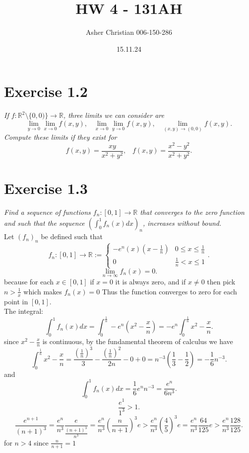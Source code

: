 \documentclass{amsart}
\title{HW 4 - 131AH}
\author{Asher Christian 006-150-286}
\date{15.11.24}
\begin{document}
    \maketitle
    \section{Exercise 1.2}
    \emph{If $f: \mathbb{R}^2 \setminus \{0,0)\} \rightarrow \mathbb{R}$, three limits we can consider are
        \[
        \lim_{y\to 0}\lim_{x\to 0}f(x,y), \;\;\; \lim_{x\to 0}\lim_{y\to 0}f(x,y), \;\;\; \lim_{(x,y)\to (0,0)}f(x,y)
        .\] 
        Compute these limits if they exist for
        \[
        f(x,y) = \frac{xy}{x^2+y^2}, \;\;\; f(x,y) = \frac{x^2-y^2}{x^2+y^2}
        .\] 
    }

    \section{Exercise 1.3}
    \emph{Find a sequence of functions $f_n: [0,1] \rightarrow \mathbb{R}$ that converges to the
        zero function and such that the sequence $( \int_{0}^{1}f_n(x)dx)_n$, increases without bound.
    }\\
    Let $(f_n)_n$ be defined such that
    \[
        f_n : [0,1] \rightarrow \mathbb{R} :=
    \begin{cases}
        -e^{n}(x)(x-\frac{1}{n}) & 0 \le x \le \frac{1}{n}\\
        0 & \frac{1}{n} < x \le 1
    \end{cases}
    .\] 
     \[
    \lim_{n\to \infty}f_n(x) = 0
    .\] 
    because for each $x \in [0,1]$ if $x = 0$ it is always zero, and if $x \ne 0$ then pick $n > \frac{1}{x}$ which makes $f_n(x) = 0$ 
    Thus the function converges to zero for each point in $[0,1]$.\\
    The integral:
    \[
    \int_{0}^{1}f_n(x)dx = \int_{0}^{\frac{1}{n}}-e^{n}(x^2-\frac{x}{n}) = -e^{n}\int_{0}^{\frac{1}{n}}x^2-\frac{x}{n} 
    .\] 
    since $x^2-\frac{x}{n}$ is continuous, by the fundamental theorem of calculus we have
    \[
    \int_{0}^{\frac{1}{n}}x^2-\frac{x}{n} = \frac{(\frac{1}{n})^{3}}{3}-\frac{(\frac{1}{n})^2}{2n} - 0 + 0 = n^{-3}(\frac{1}{3}-\frac{1}{2}) = -\frac{1}{6}n^{-3}
    .\] 
    and
    \[
        \int_{0}^{1}f_n(x)dx = \frac{1}{6}e^{n}n^{-3} = \frac{e^{n}}{6n^{3}}
    .\] 
    \[
        \frac{e^{1}}{1^{3}} > 1
    .\] 
    \[
    \frac{e^{n+1}}{(n+1)^{3}} = \frac{e^{n}}{n^{3}} \frac{e}{\frac{(n+1)^{3}}{n^{3}}} = \frac{e^{n}}{n^{3}} (\frac{n}{n+1})^{3}e  > \frac{e^{n}}{n^{3}} (\frac{4}{5})^{3}e = \frac{e^{n}}{n^{3}} \frac{64}{125}e > \frac{e^{n}}{n^{3}} \frac{128}{125}
    .\] 
    for $n > 4$ since $\frac{n}{n+1} = 1 $
\end{document}
